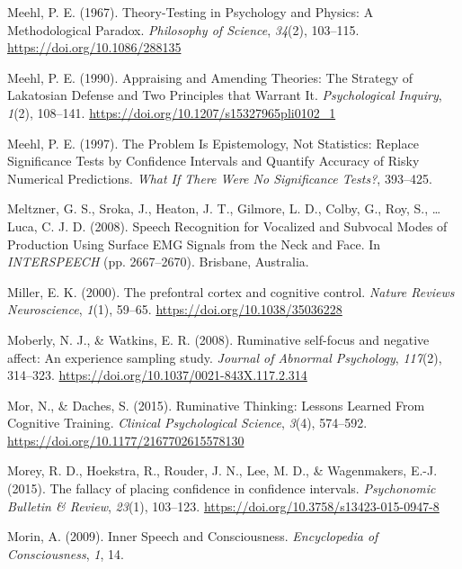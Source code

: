 \documentclass[a4paper,12pt,twoside,openright,oldfontcommands,final]{memoir}
\begin{document}
\leavevmode\hypertarget{ref-meehl_theory-testing_1967}{}%
Meehl, P. E. (1967). Theory-Testing in Psychology and Physics: A Methodological Paradox. \emph{Philosophy of Science}, \emph{34}(2), 103--115. \url{https://doi.org/10.1086/288135}

\leavevmode\hypertarget{ref-meehl_appraising_1990}{}%
Meehl, P. E. (1990). Appraising and Amending Theories: The Strategy of Lakatosian Defense and Two Principles that Warrant It. \emph{Psychological Inquiry}, \emph{1}(2), 108--141. \url{https://doi.org/10.1207/s15327965pli0102_1}

\leavevmode\hypertarget{ref-harlow_problem_1997}{}%
Meehl, P. E. (1997). The Problem Is Epistemology, Not Statistics: Replace Significance Tests by Confidence Intervals and Quantify Accuracy of Risky Numerical Predictions. \emph{What If There Were No Significance Tests?}, 393--425.

\leavevmode\hypertarget{ref-meltzner_speech_2008}{}%
Meltzner, G. S., Sroka, J., Heaton, J. T., Gilmore, L. D., Colby, G., Roy, S., \ldots{} Luca, C. J. D. (2008). Speech Recognition for Vocalized and Subvocal Modes of Production Using Surface EMG Signals from the Neck and Face. In \emph{INTERSPEECH} (pp. 2667--2670). Brisbane, Australia.

\leavevmode\hypertarget{ref-miller_prefontral_2000}{}%
Miller, E. K. (2000). The prefontral cortex and cognitive control. \emph{Nature Reviews Neuroscience}, \emph{1}(1), 59--65. \url{https://doi.org/10.1038/35036228}

\leavevmode\hypertarget{ref-Moberly2008}{}%
Moberly, N. J., \& Watkins, E. R. (2008). Ruminative self-focus and negative affect: An experience sampling study. \emph{Journal of Abnormal Psychology}, \emph{117}(2), 314--323. \url{https://doi.org/10.1037/0021-843X.117.2.314}

\leavevmode\hypertarget{ref-mor_ruminative_2015}{}%
Mor, N., \& Daches, S. (2015). Ruminative Thinking: Lessons Learned From Cognitive Training. \emph{Clinical Psychological Science}, \emph{3}(4), 574--592. \url{https://doi.org/10.1177/2167702615578130}

\leavevmode\hypertarget{ref-morey_fallacy_2015}{}%
Morey, R. D., Hoekstra, R., Rouder, J. N., Lee, M. D., \& Wagenmakers, E.-J. (2015). The fallacy of placing confidence in confidence intervals. \emph{Psychonomic Bulletin \& Review}, \emph{23}(1), 103--123. \url{https://doi.org/10.3758/s13423-015-0947-8}

\leavevmode\hypertarget{ref-morin_inner_2009}{}%
Morin, A. (2009). Inner Speech and Consciousness. \emph{Encyclopedia of Consciousness}, \emph{1}, 14.
\end{document}
